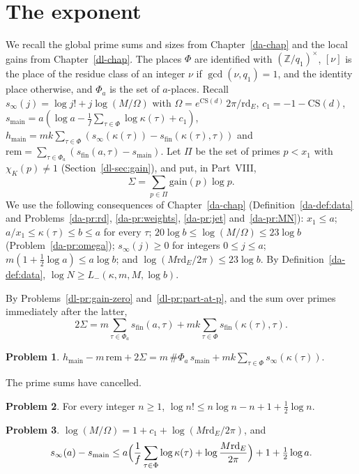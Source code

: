 \documentclass[reqno]{amsart}
\newcounter{chap}
\theoremstyle{definition}
\newtheorem{problem}{Problem}[section]
\theoremstyle{plain}
\theoremstyle{remark}
\newcommand{\Z}{\mathbb{Z}}
\newcommand{\gain}{\mathrm{gain}}
\newcommand{\rem}{\mathrm{rem}}
\newcommand{\hm}{h_{\mathrm{main}}}
\newcommand{\sinf}{s_\infty}
\newcommand{\sfin}{s_{\mathrm{fin}}}
\newcommand{\smain}{s_{\mathrm{main}}}
\newcommand{\rd}{\mathrm{rd}_E}
\begin{document}
\section{The exponent}\label{sec:exponent}

We recall the global prime sums and sizes from Chapter~\ref{da-chap} and the local gains from Chapter~\ref{dl-chap}.  The places \(\Phi\) are identified with \((\Z/q_1)^\times\), \([\nu]\) is the place of the residue class of an integer \(\nu\) if \(\gcd(\nu, q_1) = 1\), and the identity place otherwise, and \(\Phi_a\) is the set of \(a\)-places.  Recall \(\sinf(j) = \log j! + j\log(M/\Omega)\) with \(\Omega = e^{\mathrm{CS}(d)}\,2\pi/\rd\), \(c_1 = -1 - \mathrm{CS}(d)\), \(\smain = a(\log a - \frac1f\sum_{\tau \in \Phi}\log\kappa(\tau) + c_1)\), \(\hm = mk\sum_{\tau \in \Phi}(\sinf(\kappa(\tau)) - \sfin(\kappa(\tau), \tau))\) and \(\rem = \sum_{\tau \in \Phi_a}(\sfin(a, \tau) - \smain)\).  Let \(\Pi\) be the set of primes \(p < x_1\) with \(\chi_K(p) \ne 1\) (Section~\ref{dl-sec:gain}), and put, in Part~VIII,
\[
  \Sigma = \sum_{p \in \Pi}\gain(p)\log p .
\]
We use the following consequences of Chapter~\ref{da-chap} (Definition~\ref{da-def:data} and Problems~\ref{da-pr:rd}, \ref{da-pr:weights}, \ref{da-pr:jet} and~\ref{da-pr:MN}): \(x_1 \le a\); \(a/x_1 \le \kappa(\tau) \le b \le a\) for every \(\tau\); \(20\log b \le \log(M/\Omega) \le 23\log b\) (Problem~\ref{da-pr:omega}); \(\sinf(j) \ge 0\) for integers \(0 \le j \le a\); \(m(1 + \frac12\log a) \le a\log b\); and \(\log(M\rd/2\pi) \le 23\log b\).  By Definition~\ref{da-def:data}, \(\log N \ge L_-(\kappa, m, M, \log b)\).

By Problems~\ref{dl-pr:gain-zero} and~\ref{dl-pr:part-at-p}, and the sum over primes immediately after the latter,
\[
  2\Sigma = m\sum_{\tau \in \Phi_a}\sfin(a, \tau) + mk\sum_{\tau \in \Phi}\sfin(\kappa(\tau), \tau) .
\]

\begin{problem}\label{pr:exponent-identity}
\(\hm - m\,\rem + 2\Sigma = m\,\#\Phi_a\, \smain + mk\sum_{\tau \in \Phi}\sinf(\kappa(\tau))\).
\end{problem}

The prime sums have cancelled.

\begin{problem}\label{pr:stirling}
For every integer \(n \ge 1\), \(\log n! \le n\log n - n + 1 + \frac12\log n\).
\end{problem}

\begin{problem}\label{pr:excess}
\(\log(M/\Omega) = 1 + c_1 + \log(M\rd/2\pi)\), and
\[
  \sinf(a) - \smain \le a\Bigl(\frac1f\sum_{\tau \in \Phi}\log\kappa(\tau) + \log\frac{M\rd}{2\pi}\Bigr) + 1 + \tfrac12\log a .
\]
\end{problem}
\end{document}
